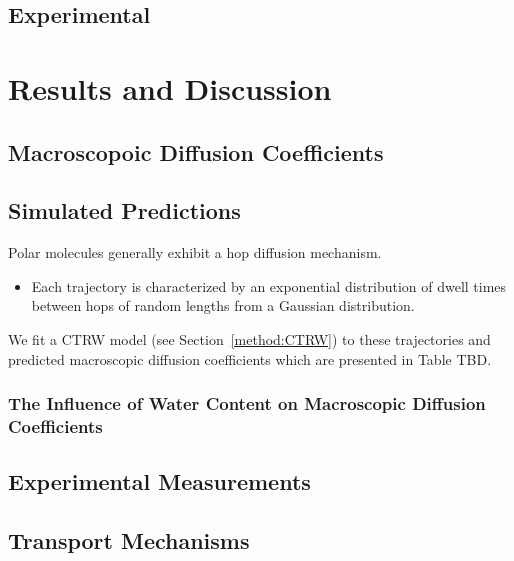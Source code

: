 \documentclass{article}
\begin{document}
  \subsection{Experimental}
   
  \section{Results and Discussion}

  \subsection{Macroscopoic Diffusion Coefficients}

  \subsection{Simulated Predictions}\label{section:D_macro}
 
  Polar molecules generally exhibit a hop diffusion mechanism. 
  \begin{itemize}
	\item Each trajectory is characterized by an exponential distribution of
	dwell times between hops of random lengths from a Gaussian distribution.
  \end{itemize}

  We fit a CTRW model (see Section~\ref{method:CTRW}) to these 
  trajectories and predicted macroscopic diffusion coefficients which are
  presented in Table TBD.



  \subsubsection*{The Influence of Water Content on Macroscopic Diffusion Coefficients}

  \subsection{Experimental Measurements}


  \subsection{Transport Mechanisms}
\end{document}
